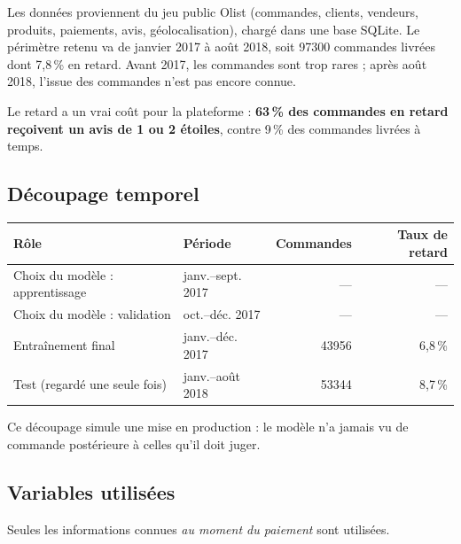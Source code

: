 \documentclass[11pt,a4paper]{article}
\begin{document}
Les données proviennent du jeu public Olist (commandes, clients, vendeurs, produits, paiements,
avis, géolocalisation), chargé dans une base SQLite. Le périmètre retenu va de janvier 2017 à
août 2018, soit \num{97300} commandes livrées dont 7,8\,\% en retard. Avant 2017, les commandes
sont trop rares ; après août 2018, l'issue des commandes n'est pas encore connue.

Le retard a un vrai coût pour la plateforme : \textbf{63\,\% des commandes en retard reçoivent
un avis de 1 ou 2 étoiles}, contre 9\,\% des commandes livrées à temps.

\subsection{Découpage temporel}

\begin{center}
\begin{tabular}{@{}llrr@{}}
\toprule
Rôle & Période & Commandes & Taux de retard \\
\midrule
Choix du modèle : apprentissage & janv.–sept. 2017 & --- & --- \\
Choix du modèle : validation & oct.–déc. 2017 & --- & --- \\
Entraînement final & janv.–déc. 2017 & \num{43956} & 6,8\,\% \\
Test (regardé une seule fois) & janv.–août 2018 & \num{53344} & 8,7\,\% \\
\bottomrule
\end{tabular}
\end{center}

Ce découpage simule une mise en production : le modèle n'a jamais vu de commande postérieure
à celles qu'il doit juger.

\subsection{Variables utilisées}

Seules les informations connues \emph{au moment du paiement} sont utilisées.
\end{document}
